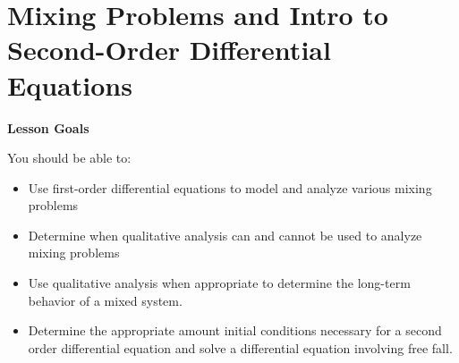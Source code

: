 \documentclass[main]{subfiles}
\begin{document}
\ifSubfilesClassLoaded{%
  \chaptermark{\chapterthree}
}{}

\section{Mixing Problems and Intro to Second-Order Differential Equations} \label{ws3-5}

\begin{framed}
\centerline{\textbf{Lesson Goals}}

You should be able to:
\begin{itemize}
\item Use first-order differential equations to model and analyze various mixing problems
\item Determine when qualitative analysis can and cannot be used to analyze mixing problems
\item Use qualitative analysis when appropriate to determine the long-term behavior of a mixed system.
\item Determine the appropriate amount initial conditions necessary for a second order differential equation and solve a differential equation involving free fall.
\end{itemize}
\end{framed}
\end{document}
